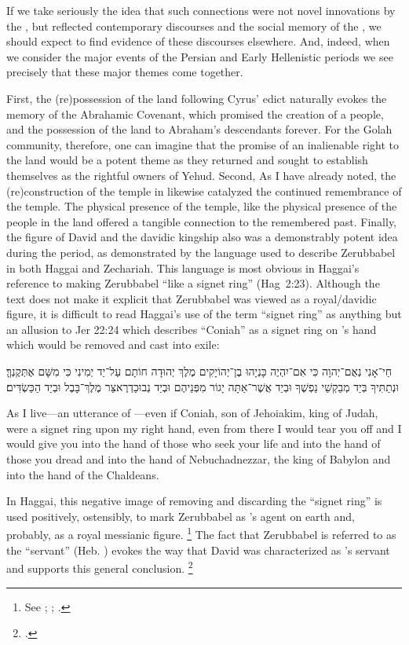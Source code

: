 If we take seriously the idea that such connections were not novel innovations by the \chronicler, but reflected contemporary discourses and the social memory of the \chronicler, we should expect to find evidence of these discourses elsewhere. And, indeed, when we consider the major events of the Persian and Early Hellenistic periods we see precisely that these major themes come together.

First, the (re)possession of the land following Cyrus' edict naturally evokes the memory of the Abrahamic Covenant, which promised the creation of a people, and the possession of the land to Abraham's descendants forever. For the Golah community, therefore, one can imagine that the promise of an inalienable right to the land would be a potent theme as they returned and sought to establish themselves as the rightful owners of Yehud. Second, As I have already noted, the (re)construction of the temple in  likewise catalyzed the continued remembrance of the temple. The physical presence of the temple, like the physical presence of the people in the land offered a tangible connection to the remembered past. Finally, the figure of David and the davidic kingship also was a demonstrably potent idea during the \secondtemple period, as demonstrated by the language used to describe Zerubbabel in both Haggai and Zechariah. This language is most obvious in Haggai's reference to \yahweh making Zerubbabel ``like a signet ring'' (Hag~2:23). Although the text does not make it explicit that Zerubbabel was viewed as a royal/davidic figure, it is difficult to read Haggai's use of the term ``signet ring'' as anything but an allusion to Jer 22:24 which describes ``Coniah'' as a signet ring on \yahweh's hand which would be removed and cast into exile:
\begin{hebrewtext}
    חַי־אָנִי נְאֻם־יְהוָה כִּי אִם־יִהְיֶה כָּנְיָהוּ בֶן־יְהוֹיָקִים מֶלֶךְ יְהוּדָה חוֹתָם עַל־יַד יְמִינִי כִּי מִשָּׁם אֶתְּקֶנְךָּ׃ 
    וּנְתַתִּיךָ בְּיַד מְבַקְשֵׁי נַפְשֶׁךָ וּבְיַד אֲשֶׁר־אַתָּה יָגוֹר מִפְּנֵיהֶם וּבְיַד נְבוּכַדְרֶאצַּר מֶלֶךְ־בָּבֶל וּבְיַד הַכַּשְׂדִּים׃
\end{hebrewtext}
\begin{translation}
    As I live---an utterance of \yahweh---even if Coniah, son of Jehoiakim, king of Judah, were a signet ring upon my right hand, even from there I would tear you off
    and I would give you into the hand of those who seek your life and into the hand of those you dread and into the hand of Nebuchadnezzar, the king of Babylon and into the hand of the Chaldeans.
\end{translation}
\noindent
In Haggai, this negative image of \yahweh removing and discarding the ``signet ring'' is used positively, ostensibly, to mark Zerubbabel as \yahweh's agent on earth and, probably, as a royal messianic figure.%
    \footnote{See
        \cite[71--103]{blenkinsopp2013};
        \cite[2:281--284]{vonrad1962};
        \cite[187]{redditt_interpretation2007}.}
The fact that Zerubbabel is referred to as the ``servant'' (Heb. ) evokes the way that David was characterized as \yahweh's servant and supports this general conclusion.%
    \footnote{\cite[80--81]{blenkinsopp2013}.}

